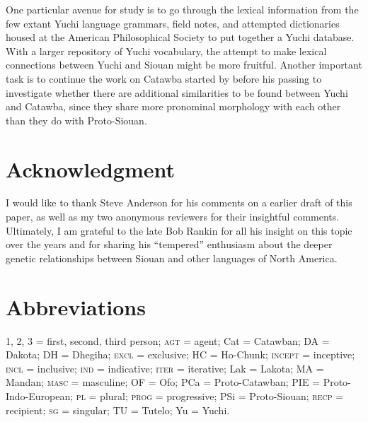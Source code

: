 \documentclass[output=paper]{LSP/langsci}
\begin{document}
One particular avenue for study is to go through the lexical information from the few extant Yuchi language grammars, field notes, and attempted dictionaries housed at the American Philosophical Society to put together a Yuchi database. With a larger repository of Yuchi vocabulary, the attempt to make lexical connections between Yuchi and Siouan might be more fruitful. Another important task is to continue the work on Catawba started by \citet{Rudes2007} before his passing to investigate whether there are additional similarities to be found between Yuchi and Catawba, since they share more pronominal morphology with each other than they do with Proto-Siouan.

\section*{Acknowledgment}

I would like to thank Steve Anderson for his comments on a earlier draft of this paper, as well as my two anonymous reviewers for their insightful comments. Ultimately, I am grateful to the late Bob Rankin for all his insight on this topic over the years and for sharing his ``tempered'' enthusiasm about the deeper genetic relationships between Siouan and other languages of North America.

\section*{Abbreviations}
1, 2, 3 = first, second, third person; \textsc{agt} = agent; Cat = Catawban; DA = Dakota; DH = Dhegiha; \textsc{excl} = exclusive; HC = Ho-Chunk; \textsc{incept} = inceptive; \textsc{incl} = inclusive; \textsc{ind} = indicative; \textsc{iter} = iterative; Lak = Lakota; MA = Mandan; \textsc{masc} = masculine; OF = Ofo; PCa = Proto-Catawban; PIE = Proto-Indo-European; \textsc{pl} = plural; \textsc{prog} = progressive; PSi = Proto-Siouan; \textsc{recp} = recipient; \textsc{sg} = singular; TU = Tutelo; Yu = Yuchi.

\nocite{CrawfordNotebooks,Crawford1979}

\printbibliography[heading=subbibliography,notkeyword=this]
 
\end{document}
